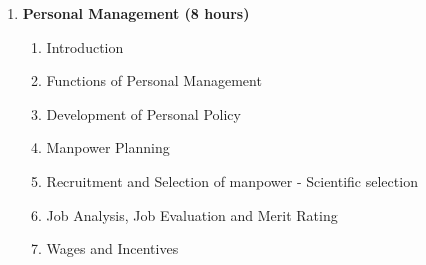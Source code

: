 \begin{enumerate}
\begin{enumerate}
      \item Organizational Structure \hfill (2 hours)
        \begin{enumerate}
          \item Line Organization - Advantages and disadvantages
          \item Functional Organization - Advantages and disadvantages
          \item Line and Staff Organization - Advantages and disadvantages
          \item Committee Organization - Advantages and disadvantages
        \end{enumerate}

      \item Purchasing and Marketing Management \hfill (4 hours)
        \begin{enumerate}
          \item Purchasing - Introduction
          \item Functions of Purchasing Department
          \item Methods of Purchasing
          \item Marketing - Introduction
          \item Functions of Marketing
          \item Advertising
        \end{enumerate}
      
    \end{enumerate}
    \vs
  
  \item \textbf{Personal Management \hfill (8 hours)}
    \begin{enumerate}
      \item Introduction
      \item Functions of Personal Management
      \item Development of Personal Policy
      \item Manpower Planning
      \item Recruitment and Selection of manpower - Scientific selection
      \item Job Analysis, Job Evaluation and Merit Rating
      \item Wages and Incentives
    \end{enumerate}


\end{enumerate}
